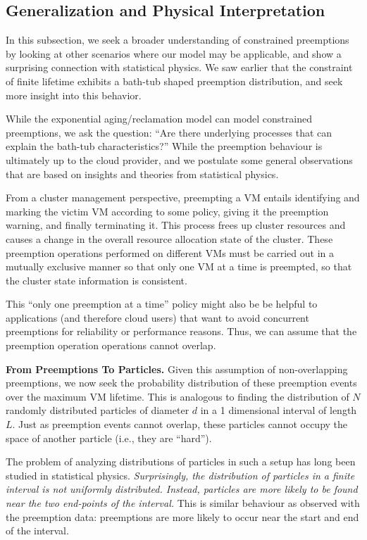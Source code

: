 \subsection{Generalization and Physical Interpretation}

In this subsection, we seek a broader understanding of constrained preemptions by looking at other scenarios where our model may be applicable, and show a surprising connection with statistical physics. 
We saw earlier that the constraint of finite lifetime exhibits a bath-tub shaped preemption distribution, and seek more insight into this behavior.



While the exponential aging/reclamation model can model constrained preemptions, we ask the question: ``Are there underlying processes that can explain the bath-tub characteristics?''
While the preemption behaviour is ultimately up to the cloud provider, and we postulate some general observations that are based on insights and theories from statistical physics. 


From a cluster management perspective, preempting a VM entails identifying and marking the victim VM according to some policy, giving it the preemption warning, and finally terminating it.
This process frees up cluster resources and causes a change in the overall resource allocation state of the cluster. 
These preemption operations performed on different VMs must be carried out in a mutually exclusive manner so that only one VM at a time is preempted, so that the cluster state information is consistent.


This ``only one preemption at a time'' policy might also be be helpful to applications (and therefore cloud users) that want to avoid concurrent preemptions for reliability or performance reasons. %
Thus, we can assume that the preemption operation operations cannot overlap.


\noindent \textbf{From Preemptions To Particles.}
Given this assumption of non-overlapping preemptions, we now seek the probability distribution of these preemption events over the maximum VM lifetime. 
This is analogous to finding the distribution of $N$ randomly distributed  particles of diameter $d$ in a 1 dimensional interval of length $L$.
Just as preemption events cannot overlap, these particles cannot occupy the space of another particle (i.e., they are ``hard'').


The problem of analyzing distributions of particles in such a setup has long been studied in statistical physics. 
\emph{Surprisingly, the distribution of particles in a finite interval is not uniformly distributed. 
  Instead, particles are more likely to be found near the two end-points of the interval.}
This is similar behaviour as observed with the preemption data: preemptions are more likely to occur near the start and end of the interval. 


